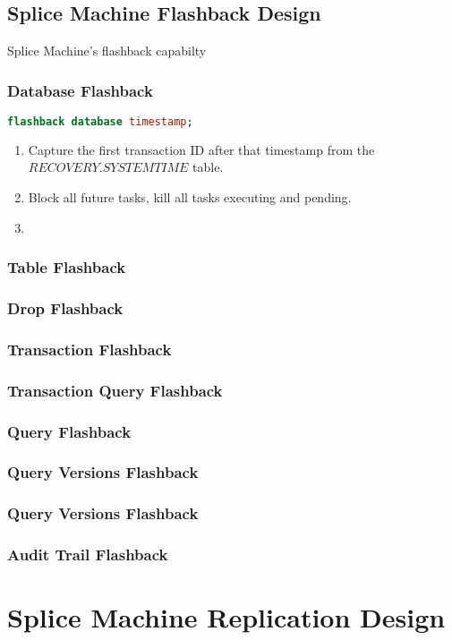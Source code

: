\subsection{Splice Machine Flashback Design}
Splice Machine's flashback capabilty

\subsubsection{Database Flashback}

\begin{lstlisting}[frame=single,captionpos=b,language=SQL,caption=Procedure to
Perform a Database Flashback] 
flashback database timestamp;
\end{lstlisting}

\begin{enumerate}
	\item Capture the first transaction ID after that timestamp from the
	${RECOVERY.SYSTEMTIME}$ table.
	\item Block all future tasks, kill all tasks executing and pending.
	\item 
\end{enumerate}

\subsubsection{Table Flashback}

\subsubsection{Drop Flashback}

\subsubsection{Transaction Flashback}

\subsubsection{Transaction Query Flashback}

\subsubsection{Query Flashback}

\subsubsection{Query Versions Flashback}

\subsubsection{Query Versions Flashback}

\subsubsection{Audit Trail Flashback}

\section{Splice Machine Replication Design}

